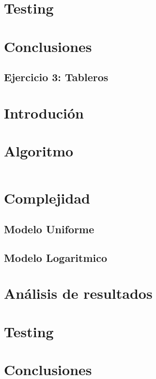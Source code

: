 \documentclass[a4paper, 12pt] {article}
\begin{document}
\section*{Testing}

\begin{comment}
\begin{center}
\includegraphicx[width=0.7\textwidth]{Plots/Ej1-Complejidad.png}
\begin{center}
FiguraX
\end{center}
\end{comment}

\section*{Conclusiones}
\newpage

\begin{center}
 \section*{Ejercicio 3: Tableros}
\end{center}

\bigskip
\section*{Introduci\'on}

\section*{Algoritmo}

\begin{verbatim}
\end{verbatim}

\section*{Complejidad}

\subsection*{Modelo Uniforme}

\subsection*{Modelo Logaritmico}

\section*{An\'alisis de resultados}

\section*{Testing}

\begin{comment}
\begin{center}
\includegraphicx[width=0.7\textwidth]{Plots/Ej1-Complejidad.png}
\begin{center}
FiguraX
\end{center}
\end{center}
\end{comment}
\section*{Conclusiones}
\end{document}
